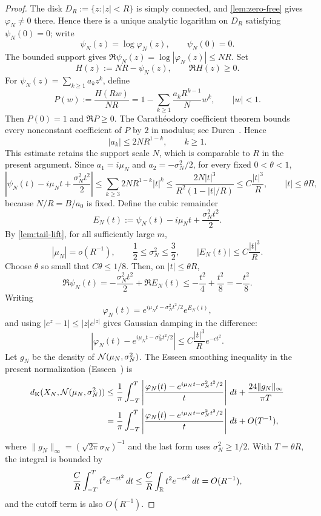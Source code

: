 \begin{proof}
The disk $D_R:=\{z:|z|<R\}$ is simply connected, and \cref{lem:zero-free} gives $\varphi_N\ne0$ there. Hence there is a unique analytic logarithm on $D_R$ satisfying $\psi_N(0)=0$; write
\[
\psi_N(z)=\log\varphi_N(z),\qquad \psi_N(0)=0.
\]
The bounded support gives $\Re\psi_N(z)=\log|\varphi_N(z)|\le NR$. Set
\[
H(z):=NR-\psi_N(z),\qquad \Re H(z)\ge0.
\]
For $\psi_N(z)=\sum_{k\ge1}a_kz^k$, define
\[
P(w):=\frac{H(Rw)}{NR}
=1-\sum_{k\ge1}\frac{a_kR^{k-1}}{N}w^k,
\qquad |w|<1.
\]
Then $P(0)=1$ and $\Re P\ge0$. The Carath\'eodory coefficient theorem bounds every nonconstant coefficient of $P$ by $2$ in modulus; see Duren~\cite{Duren1983}. Hence
\[
|a_k|\le2NR^{1-k},\qquad k\ge1.
\]
This estimate retains the support scale $N$, which is comparable to $R$ in the present argument.
Since $a_1=i\mu_N$ and $a_2=-\sigma_N^2/2$, for every fixed $0<\theta<1$,
\[
\left|\psi_N(t)-i\mu_Nt+\frac{\sigma_N^2t^2}{2}\right|
\le \sum_{k\ge3}2NR^{1-k}|t|^k
\le \frac{2N|t|^3}{R^2(1-|t|/R)}
\le C\frac{|t|^3}{R},
\qquad |t|\le\theta R,
\]
because $N/R=B/a_0$ is fixed. Define the cubic remainder
\[
E_N(t):=\psi_N(t)-i\mu_Nt+\frac{\sigma_N^2t^2}{2}.
\]
By \cref{lem:tail-lift}, for all sufficiently large $m$,
\[
|\mu_N|=o(R^{-1}),
\qquad
\frac12\le\sigma_N^2\le\frac32,
\qquad
|E_N(t)|\le C\frac{|t|^3}{R}.
\]
Choose $\theta$ so small that $C\theta\le1/8$. Then, on $|t|\le\theta R$,
\[
\Re\psi_N(t)=-\frac{\sigma_N^2t^2}{2}+\Re E_N(t)
\le-\frac{t^2}{4}+\frac{t^2}{8}=-\frac{t^2}{8}.
\]
Writing
\[
\varphi_N(t)=e^{i\mu_Nt-\sigma_N^2t^2/2}e^{E_N(t)},
\]
and using $|e^z-1|\le|z|e^{|z|}$ gives Gaussian damping in the difference:
\[
\left|\varphi_N(t)-e^{i\mu_Nt-\sigma_N^2t^2/2}\right|
\le C\frac{|t|^3}{R}e^{-ct^2}.
\]
Let $g_N$ be the density of $\mathcal N(\mu_N,\sigma_N^2)$. The Esseen smoothing inequality in the present normalization (Esseen~\cite{Esseen1945}) is
\[
\begin{aligned}
d_{\mathrm K}(X_N,\mathcal N(\mu_N,\sigma_N^2))
&\le \frac1\pi\int_{-T}^{T}
\left|\frac{\varphi_N(t)-e^{i\mu_Nt-\sigma_N^2t^2/2}}{t}\right|\,dt
 +\frac{24\|g_N\|_\infty}{\pi T}\\
&= \frac1\pi\int_{-T}^{T}
\left|\frac{\varphi_N(t)-e^{i\mu_Nt-\sigma_N^2t^2/2}}{t}\right|\,dt
 +O(T^{-1}),
\end{aligned}
\]
where $\|g_N\|_\infty=(\sqrt{2\pi}\sigma_N)^{-1}$ and the last form uses $\sigma_N^2\ge1/2$. With $T=\theta R$, the integral is bounded by
\[
\frac{C}{R}\int_{-T}^{T}t^2e^{-ct^2}\,dt
\le\frac{C}{R}\int_\mathbb R t^2e^{-ct^2}\,dt
 =O(R^{-1}),
\]
and the cutoff term is also $O(R^{-1})$.


\end{proof}
